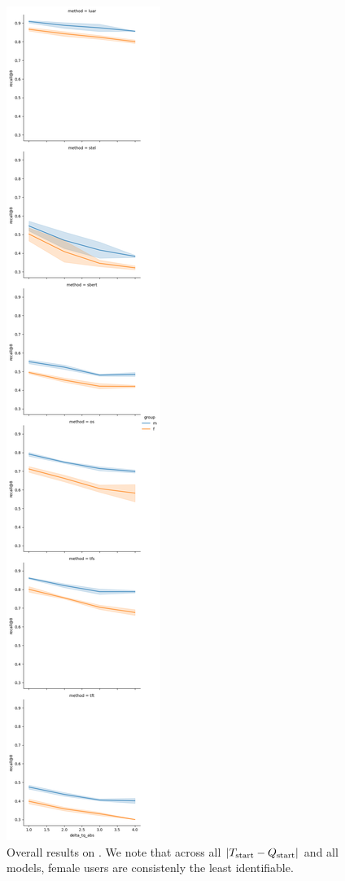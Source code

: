 \begin{figure}[h]
    \centering
    \includegraphics[height=0.8\textheight]{stylometryExtensions/figures/demo/varydelta_demographic_groupwise_gender.png}
    \caption{Overall results on \DSgendervary{}. We note that across all $|T_{\rm{start}} - Q_{\rm{start}}|$ and all models, female users are consistenly the least identifiable.}
    \label{fig:demographic_vary:gender}
\end{figure}

